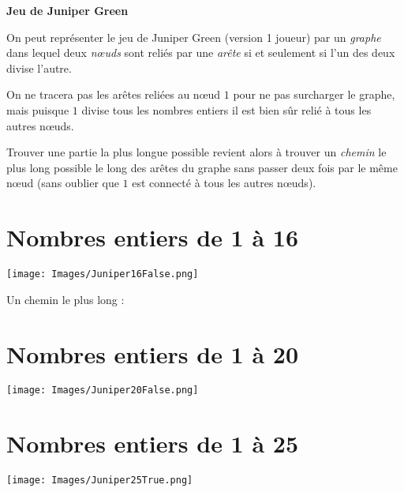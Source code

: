 \documentclass[11pt]{article}
\newcommand{\ligne}{{\color{gray!60}\hrulefill}}
\begin{document}
\begin{tcolorbox}[colback=teal!10!white, colframe=teal!80!black]
\begin{center}
\large\textbf{Jeu de Juniper Green {\emoji 🧗}}
\end{center}
\end{tcolorbox}

\vspace{1.5em}

On peut représenter le jeu de Juniper Green (version 1 joueur) par un \emph{graphe} dans lequel deux \emph{nœuds} sont reliés par une \emph{arête} si et seulement si l’un des deux divise l’autre.

On ne tracera pas les arêtes reliées au nœud $1$ pour ne pas surcharger le graphe, mais puisque $1$ divise tous les nombres entiers il est bien sûr relié à tous les autres nœuds. 

Trouver une partie la plus longue possible revient alors à trouver un \emph{chemin} le plus long possible le long des arêtes du graphe sans passer deux fois par le même nœud (sans oublier que $1$ est connecté à tous les autres nœuds).

\section*{Nombres entiers de 1 à 16}

\begin{center}
\texttt{[image: Images/Juniper16False.png]}
\end{center}

Un chemin le plus long : \ligne

\newpage

\section*{Nombres entiers de 1 à 20}

\begin{center}
\texttt{[image: Images/Juniper20False.png]}
\end{center}

\ligne

\newpage

\section*{Nombres entiers de 1 à 25}

\begin{center}
\texttt{[image: Images/Juniper25True.png]}
\end{center}

\ligne
\end{document}
